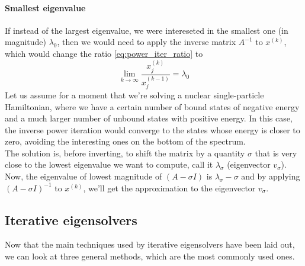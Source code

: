 \paragraph{Smallest eigenvalue}
If instead of the largest eigenvalue, we were intereseted in the smallest one (in magnitude) $\lambda_0$, then we would need to apply the inverse matrix $A^{-1}$ to $x^{(k)}$, which would change the ratio \eqref{eq:power_iter_ratio} to 
\begin{equation}
    \label{eq:power_iter_ratio_inv}
    \lim_{k\to\infty} \frac{x_j^{(k)}}{x_j^{(k-1)}} = \lambda_0
\end{equation}
Let us assume for a moment that we're solving a nuclear single-particle Hamiltonian, where we have a certain number of bound states of negative energy and a much larger number of unbound states with positive energy. In this case, the inverse power iteration would converge to the states whose energy is closer to zero, avoiding the interesting ones on the bottom of the spectrum.
\\The solution is, before inverting, to shift the matrix by a quantity $\sigma$ that is very close to the lowest eigenvalue we want to compute, call it $\lambda_\sigma$ (eigenvector $v_\sigma$).
Now, the eigenvalue of lowest magnitude of $(A-\sigma I)$ is $\lambda_\sigma - \sigma$ and by applying $(A-\sigma I)^{-1}$ to $x^{(k)}$, we'll get the approximation to the eigenvector $v_\sigma$.
\subsection{Iterative eigensolvers}
\label{sec:eigensolvers}
Now that the main techniques used by iterative eigensolvers have been laid out, we can look at three general methods, which are the most commonly used ones.
